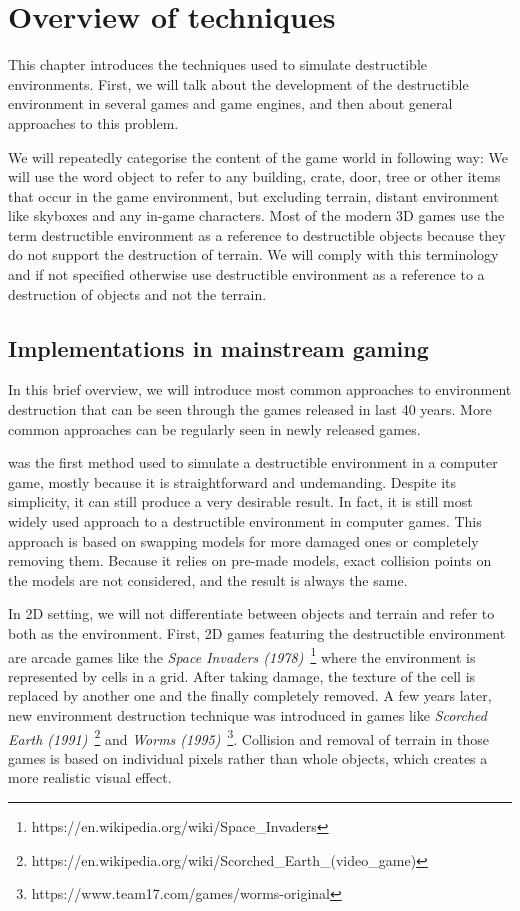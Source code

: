 \chapter{Overview of techniques}
This chapter introduces the techniques used to simulate destructible environments. First, we will talk about the development of the destructible environment in several games and game engines, and then about general approaches to this problem.

We will repeatedly categorise the content of the game world in following way: We will use the word object to refer to any building, crate, door, tree or other items that occur in the game environment, but excluding terrain, distant environment like skyboxes and any in-game characters. Most of the modern 3D games use the term destructible environment as a reference to destructible objects because they do not support the destruction of terrain. We will comply with this terminology and if not specified otherwise use destructible environment as a reference to a destruction of objects and not the terrain.

\section{Implementations in mainstream gaming}
\label{sec:common}
In this brief overview, we will introduce most common approaches to environment destruction that can be seen through the games released in last 40 years. More common approaches can be regularly seen in newly released games. 

 was the first method used to simulate a destructible environment in a computer game, mostly because it is straightforward and undemanding. Despite its simplicity, it can still produce a very desirable result. In fact, it is still most widely used approach to a destructible environment in computer games. This approach is based on swapping models for more damaged ones or completely removing them. Because it relies on pre-made models, exact collision points on the models are not considered, and the result is always the same.

In 2D setting, we will not differentiate between objects and terrain and refer to both as the environment.
First, 2D games featuring the destructible environment are arcade games like the \emph{Space Invaders (1978)}~\footnote{https://en.wikipedia.org/wiki/Space\_Invaders} where the environment is represented by cells in a grid. After taking damage, the texture of the cell is replaced by another one and the finally completely removed. A few years later, new environment destruction technique was introduced in games like  \emph{Scorched Earth (1991)}~\footnote{https://en.wikipedia.org/wiki/Scorched\_Earth\_(video\_game)} and \emph{Worms (1995)}~\footnote{https://www.team17.com/games/worms-original}. Collision and removal of terrain in those games is based on individual pixels rather than whole objects, which creates a more realistic visual effect.


